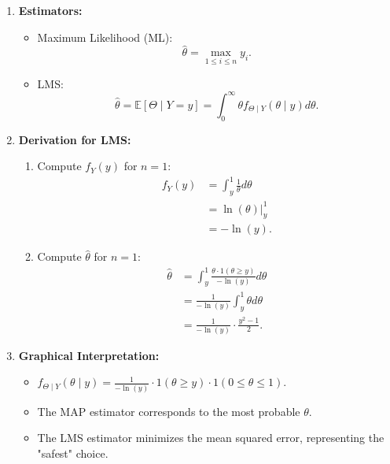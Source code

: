 \begin{enumerate}
\begin{enumerate}
        \item \textbf{Estimators:}
        \begin{itemize}
            \item Maximum Likelihood (ML): 
            \[
            \hat{\theta} = \max_{1 \leq i \leq n} y_i.
            \]

            \item LMS:
            \[
            \hat{\theta} = \mathbb{E}[\Theta \mid Y = y] = \int_{0}^\infty \theta f_{\Theta \mid Y}(\theta \mid y) d\theta.
            \]
        \end{itemize}

        \item \textbf{Derivation for LMS:}
        \begin{enumerate}
            \item Compute \( f_Y(y) \) for \( n = 1 \):
            \begin{align*}
                f_Y(y) &= \int_y^1 \frac{1}{\theta} d\theta \\
                &= \ln(\theta) \Big|_y^1 \\
                &= -\ln(y).
            \end{align*}

            \item Compute \( \hat{\theta} \) for \( n = 1 \):
            \begin{align*}
                \hat{\theta} &= \int_y^1 \frac{\theta \cdot 1(\theta \geq y)}{-\ln(y)} d\theta \\
                &= \frac{1}{-\ln(y)} \int_y^1 \theta d\theta \\
                &= \frac{1}{-\ln(y)} \cdot \frac{y^2 - 1}{2}.
            \end{align*}
        \end{enumerate}

        \item \textbf{Graphical Interpretation:}
        \begin{itemize}
            \item \( f_{\Theta \mid Y}(\theta \mid y) = \frac{1}{-\ln(y)} \cdot 1(\theta \geq y) \cdot 1(0 \leq \theta \leq 1) \).
            \item The MAP estimator corresponds to the most probable \( \theta \).
            \item The LMS estimator minimizes the mean squared error, representing the "safest" choice.
        \end{itemize}
    \end{enumerate}
\end{enumerate}